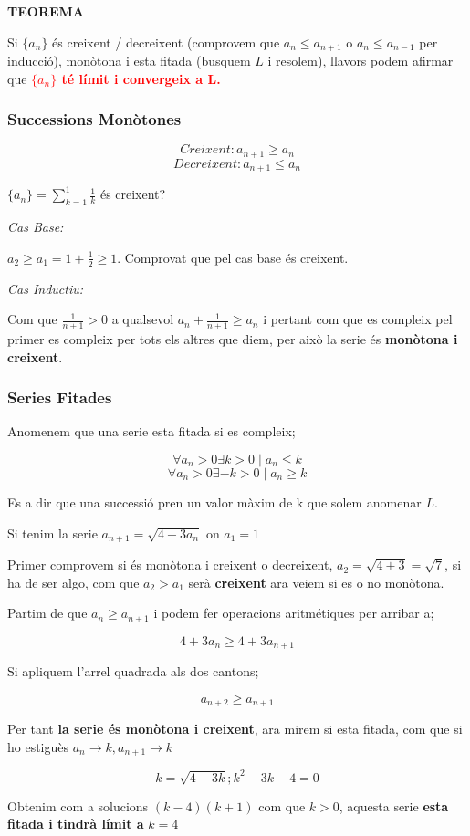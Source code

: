 \documentclass[12pt]{article}
\begin{document}
    \textbf{TEOREMA}

    Si $\{a_n\}$ és creixent / decreixent (comprovem que $a_n \leq a_{n+1}$ o $a_n \leq a_{n-1}$ per inducció), monòtona i esta fitada (busquem $L$ i resolem), llavors podem afirmar que \textcolor{red}{\textbf{$\{a_n\}$ té límit i convergeix a L.}}

    \subsubsection{Successions Monòtones}

    \[\boxed{Creixent: a_{n+1} \geq a_n}\]
    \[\boxed{Decreixent: a_{n+1} \leq a_n}\]

    $\{a_n\} = \sum_{k = 1}^{1}\frac{1}{k}$ és creixent?

    \textit{Cas Base:}

    $a_2 \geq a_{1} = 1 + \frac{1}{2} \geq 1 $. Comprovat que pel cas base és creixent.

    \textit{Cas Inductiu:}

    Com que $\frac{1}{n+1} > 0$ a qualsevol $a_n + \frac{1}{n+1} \geq a_n$ i pertant com que es compleix pel primer es compleix per tots els altres que diem, per això la serie és \textbf{monòtona i creixent}. 
    
    \subsubsection{Series Fitades}

    Anomenem que una serie esta fitada si es compleix;

    \[\forall a_n > 0 \exists k>0 \mid a_n \leq k\]
    \[\forall a_n > 0 \exists -k>0 \mid a_n \geq k\]

    Es a dir que una successió pren un valor màxim de k que solem anomenar $L$.

    \begin{examplebox}{}
        Si tenim la serie $a_{n+1} = \sqrt{4+3a_n}$ on $a_1 = 1$

        Primer comprovem si és monòtona i creixent o decreixent, $a_2 = \sqrt{4+3} = \sqrt{7}$, si ha de ser algo, com que $a_2 > a_1$ serà \textbf{creixent} ara veiem si es o no monòtona.

        Partim de que $a_n \geq a_{n+1}$ i podem fer operacions aritmétiques per arribar a;

        \[4 + 3a_n \geq 4+3a_{n+1}\]

        Si apliquem l'arrel quadrada als dos cantons;

        \[a_{n+2} \geq a_{n+1}\]

        Per tant \textbf{la serie és monòtona i creixent}, ara mirem si esta fitada, com que si ho estiguès $a_n \rightarrow k, a_{n+1}\rightarrow k$

        \[k = \sqrt{4+3k}; k^2 - 3k - 4 = 0\]

        Obtenim com a solucions $(k-4)(k+1)$ com que $k > 0$, aquesta serie \textbf{esta fitada i tindrà límit a} $k = 4$
    \end{examplebox}
\end{document}

